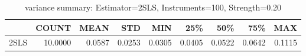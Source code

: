 \begin{table}[ht]
\centering
\caption{variance summary: Estimator=2SLS, Instruments=100, Strength=0.20}
\begin{tabular}{lrrrrrrrr}
\toprule
 & COUNT & MEAN & STD & MIN & 25\% & 50\% & 75\% & MAX \\
\midrule
2SLS & 10.0000 & 0.0587 & 0.0253 & 0.0305 & 0.0405 & 0.0522 & 0.0642 & 0.1115 \\
\bottomrule
\end{tabular}
\end{table}
